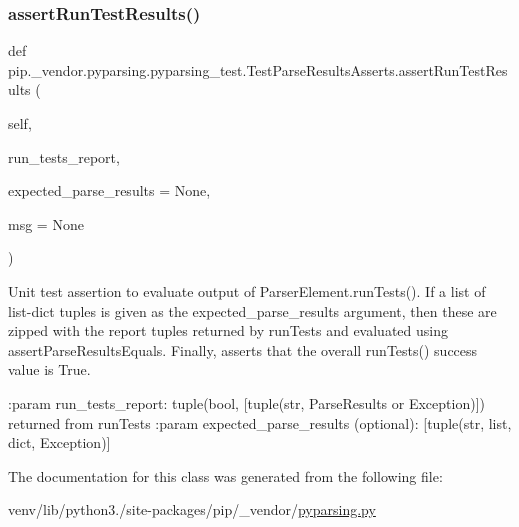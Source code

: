 \subsubsection{\texorpdfstring{assert\+Run\+Test\+Results()}{assertRunTestResults()}}
{\footnotesize\ttfamily def pip.\+\_\+vendor.\+pyparsing.\+pyparsing\+\_\+test.\+Test\+Parse\+Results\+Asserts.\+assert\+Run\+Test\+Results (\begin{DoxyParamCaption}\item[{}]{self,  }\item[{}]{run\+\_\+tests\+\_\+report,  }\item[{}]{expected\+\_\+parse\+\_\+results = {\ttfamily None},  }\item[{}]{msg = {\ttfamily None} }\end{DoxyParamCaption})}

\begin{DoxyVerb}Unit test assertion to evaluate output of ParserElement.runTests(). If a list of
list-dict tuples is given as the expected_parse_results argument, then these are zipped
with the report tuples returned by runTests and evaluated using assertParseResultsEquals.
Finally, asserts that the overall runTests() success value is True.

:param run_tests_report: tuple(bool, [tuple(str, ParseResults or Exception)]) returned from runTests
:param expected_parse_results (optional): [tuple(str, list, dict, Exception)]
\end{DoxyVerb}
 

The documentation for this class was generated from the following file\+:\begin{DoxyCompactItemize}
\item 
venv/lib/python3./site-\/packages/pip/\+\_\+vendor/\hyperlink{pip_2__vendor_2pyparsing_8py}{pyparsing.\+py}\end{DoxyCompactItemize}
